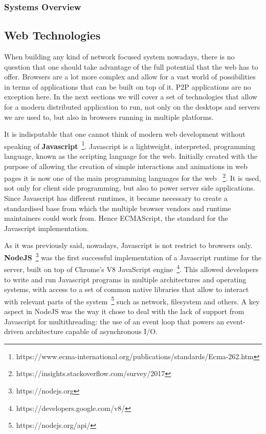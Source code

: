 \subsubsection{Systems Overview}\label{systems-overview}


\subsection{Web Technologies}\label{web-technologies}

When building any kind of network focused system nowadays, there is no
question that one should take advantage of the full potential that the
web has to offer. Browsers are a lot more complex and allow for a vast
world of possibilities in terms of applications that can be built on top
of it. P2P applications are no exception here. In the next sections we
will cover a set of technologies that allow for a modern distributed
application to run, not only on the desktops and servers we are used to,
but also in browsers running in multiple platforms.

It is indisputable that one cannot think of modern web development
without speaking of \textbf{Javascript}~\footnote{https://www.ecma-international.org/publications/standards/Ecma-262.htm}.
Javascript is a lightweight, interpreted, programming language, known as
the scripting language for the web. Initially created with the purpose
of allowing the creation of simple interactions and animations in web
pages it is now one of the main programming languages for the web
~\footnote{https://insights.stackoverflow.com/survey/2017}. It is used, not
only for client side programming, but also to power server side
applications. Since Javascript has different runtimes, it became
necessary to create a standardised base from which the multiple browser
vendors and runtime maintainers could work from. Hence ECMAScript, the standard
for the Javascript implementation.

As it was previously said, nowadays, Javascript is not restrict to
browsers only. \textbf{NodeJS}~\footnote{https://nodejs.org} was the first
successful implementation of a Javascript runtime for the server, built
on top of Chrome's V8 JavaScript engine~\footnote{https://developers.google.com/v8/}. This
allowed developers to write and run Javascript programs in multiple
architectures and operating systems, with access to a set of common
native libraries that allow to interact with relevant parts of the
system~\footnote{https://nodejs.org/api/} such as network, filesystem and
others. A key aspect in NodeJS was the way it chose to deal with the
lack of support from Javascript for multithreading: the use of an event
loop that powers an event-driven architecture capable of asynchronous
I/O.

